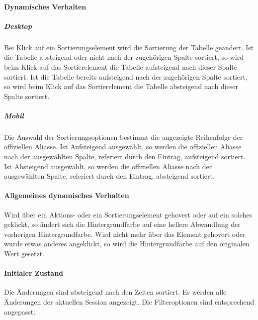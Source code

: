 \paragraph*{Dynamisches Verhalten}
\subparagraph*{Desktop}
Bei Klick auf ein Sortierungselement wird die Sortierung der Tabelle geändert.
Ist die Tabelle absteigend oder nicht nach der zugehörigen Spalte sortiert, so wird beim Klick auf das Sortierelement die Tabelle aufsteigend nach dieser Spalte sortiert.
Ist die Tabelle bereits aufsteigend nach der zugehörigen Spalte sortiert, so wird beim Klick auf das Sortierelement die Tabelle absteigend nach dieser Spalte sortiert.

\subparagraph*{Mobil}
Die Auswahl der Sortierungsoptionen bestimmt die angezeigte Reihenfolge der offiziellen Aliasse.
Ist \dq Aufsteigend \dq{} ausgewählt, so werden die offiziellen Aliasse nach der ausgewählten Spalte, referiert durch den Eintrag, aufsteigend sortiert.
Ist \dq Absteigend \dq{} ausgewählt, so werden die offiziellen Aliasse nach der ausgewählten Spalte, referiert durch den Eintrag, absteigend sortiert.

\paragraph*{Allgemeines dynamisches Verhalten}
Wird über ein Aktions- oder ein Sortierungselement gehovert oder auf ein solches geklickt, so ändert sich die Hintergrundfarbe auf eine hellere Abwandlung der vorherigen Hintergrundfarbe.
Wird nicht mehr über das Element gehovert oder wurde etwas anderes angeklickt, so wird die Hintergrundfarbe auf den originalen Wert gesetzt.

\paragraph*{Initialer Zustand}
Die Änderungen sind absteigend nach den Zeiten sortiert.
Es werden alle Änderungen der aktuellen Session angezeigt.
Die Filteroptionen sind entsprechend angepasst.